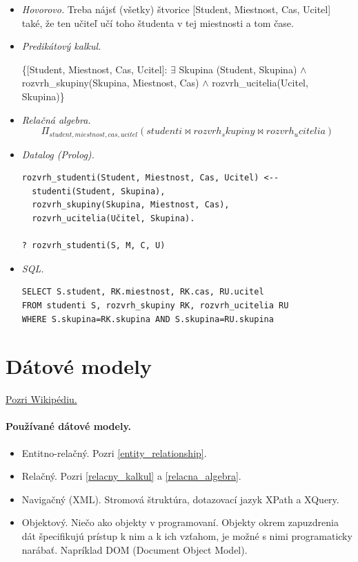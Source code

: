 \documentclass[10pt,a4paper]{article}
\begin{document}
\begin{itemize}
\item \emph{Hovorovo.} Treba nájsť (všetky) štvorice [Student, Miestnost, Cas, Ucitel]
také, že ten učiteľ učí toho študenta v tej miestnosti a tom čase.
\item \emph{Predikátový kalkul.}

\{[Student, Miestnost, Cas, Ucitel]: $\exists$ Skupina (Student, Skupina) $\wedge$ rozvrh\_skupiny(Skupina, Miestnost, Cas) $\wedge$ rozvrh\_ucitelia(Ucitel, Skupina)\}
\item \emph{Relačná algebra.}
$$
\Pi_{student, miestnost, cas, ucitel}(studenti \Join rozvrh_skupiny \Join rozvrh_ucitelia)
$$
\item \emph{Datalog (Prolog).}
\begin{verbatim}
rozvrh_studenti(Student, Miestnost, Cas, Ucitel) <--
  studenti(Student, Skupina),
  rozvrh_skupiny(Skupina, Miestnost, Cas),
  rozvrh_ucitelia(Učitel, Skupina).

? rozvrh_studenti(S, M, C, U)
\end{verbatim}

\item \emph{SQL.}
\begin{verbatim}
SELECT S.student, RK.miestnost, RK.cas, RU.ucitel
FROM studenti S, rozvrh_skupiny RK, rozvrh_ucitelia RU
WHERE S.skupina=RK.skupina AND S.skupina=RU.skupina
\end{verbatim}

\end{itemize}

\section{Dátové modely}
\href{http://en.wikipedia.org/wiki/Database_model}{Pozri Wikipédiu.}

\paragraph{Používané dátové modely.}
\begin{itemize}
\item Entitno-relačný. Pozri \ref{entity_relationship}.
\item Relačný. Pozri \ref{relacny_kalkul} a \ref{relacna_algebra}.
\item Navigačný (XML). Stromová štruktúra, dotazovací jazyk XPath a XQuery.
\item Objektový. Niečo ako objekty v programovaní. Objekty okrem zapuzdrenia dát špecifikujú prístup k nim a k ich vzťahom, je možné s nimi programaticky narábať. Napríklad DOM (Document Object Model).
\end{itemize}
\end{document}
